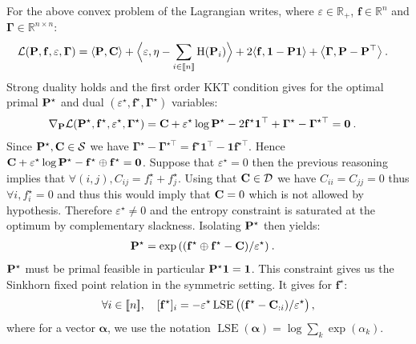 For the above convex problem of  the Lagrangian writes, where $\varepsilon \in \mathbb{R}_+$, $\mathbf{f} \in \mathbb{R}^n$ and $\bm{\Gamma} \in \mathbb{R}^{n \times n}$:
\begin{align}
    \mathcal{L}(\mathbf{P}, \mathbf{f}, \varepsilon, \bm{\Gamma}) &= \langle \mathbf{P}, \mathbf{C} \rangle + \Big\langle \varepsilon, \eta - \sum_{i \in {[\![n]\!]}} \operatorname{H}(\mathbf{P}_i) \Big\rangle + 2\langle \mathbf{f}, \bm{1} - \mathbf{P} \bm{1} \rangle + \big\langle \bm{\Gamma}, \mathbf{P} - \mathbf{P}^\top \big\rangle \:.
\end{align}
Strong duality holds and the first order KKT condition gives for the optimal primal $\mathbf{P}^\star$ and dual $(\varepsilon^\star, \mathbf{f}^\star, \bm{\Gamma}^\star)$ variables: 
\begin{align}
    \nabla_{\mathbf{P}} \mathcal{L}(\mathbf{P}^\star, \mathbf{f}^\star, \varepsilon^\star, \bm{\Gamma}^\star) &= \mathbf{C} + \varepsilon^\star \log{\mathbf{P}^\star} - 2\mathbf{f}^\star \bm{1}^\top + \bm{\Gamma}^\star - \bm{\Gamma}^{\star\top} = \bm{0} \:.
\end{align}
Since $\mathbf{P}^\star, \mathbf{C} \in \mathcal{S}$ we have $\bm{\Gamma}^\star - \bm{\Gamma}^{\star\top} = \mathbf{f}^\star \bm{1}^\top - \bm{1}\mathbf{f}^{\star \top}$. Hence $\mathbf{C} + \varepsilon^\star \log{\mathbf{P}^\star} - \mathbf{f}^\star \oplus \mathbf{f}^\star = \bm{0}$. Suppose that $\varepsilon^\star = 0$ then the previous reasoning implies that $\forall (i,j), C_{ij} = f_i^\star + f_j^\star$. Using that $\mathbf{C} \in \mathcal{D}$ we have $C_{ii} = C_{jj} = 0$ thus $\forall i,  f^\star_i = 0$ and thus this would imply that $\mathbf{C} = 0$ which is not allowed by hypothesis. Therefore $\varepsilon^\star \neq 0$ and the entropy constraint is saturated at the optimum by complementary slackness. Isolating $\mathbf{P}^\star$ then yields:
\begin{align}
    \mathbf{P}^{\star} &= \exp{\left( (\mathbf{f}^\star \oplus \mathbf{f}^{\star} - \mathbf{C}) / \varepsilon^\star \right)} \:.
\end{align}
$\mathbf{P}^\star$ must be primal feasible in particular $\mathbf{P}^\star \bm{1} = \bm{1}$. This constraint gives us the Sinkhorn fixed point relation in the symmetric setting. It gives for $\mathbf{f}^\star$:
\begin{align}
    \forall i \in {[\![n]\!]}, \quad [\mathbf{f}^\star]_i = - \varepsilon^\star \operatorname{LSE} \big((\mathbf{f}^\star - \mathbf{C}_{:i}) / \varepsilon^\star \big)\,,
\end{align}
where for a vector $\bm{\alpha}$, we use the notation
$\operatorname{LSE}(\bm{\alpha}) = \log \sum_{k} \exp (\alpha_k)$.

